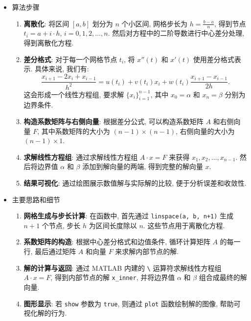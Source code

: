\documentclass[11pt]{article}
\begin{document}
\begin{itemize}
	\item 算法步骤
	
	\begin{enumerate}
		\item \textbf{离散化}: 将区间 $[a, b]$ 划分为 $n$ 个小区间, 网格步长为 $h = \frac{b - a}{n}$, 得到节点 $t_i = a + i \cdot h$, $i=0, 1, 2, \dots, n$. 然后对方程中的二阶导数进行中心差分处理, 得到离散化方程. 
		
		\item \textbf{差分格式}: 对于每一个网格节点 $t_i$, 将 $x''(t)$ 和 $x'(t)$ 使用差分格式表示. 具体来说, 我们有:
		\begin{equation*}
			\frac{x_{i+1} - 2x_i + x_{i-1}}{h^2} = u(t_i) + v(t_i) x_i + w(t_i) \frac{x_{i+1} - x_{i-1}}{2h}.
		\end{equation*}
		这会形成一个线性方程组, 要求解 $\{x_i\}_{i=1}^{n-1}$, 其中 $x_0 = \alpha$ 和 $x_n = \beta$ 分别为边界条件.
		
		\item \textbf{构造系数矩阵与右侧向量}: 根据差分公式, 可以构造系数矩阵 $A$ 和右侧向量 $F$, 其中系数矩阵的大小为 $(n-1) \times (n-1)$, 右侧向量的大小为 $(n-1) \times 1$.
		
		\item \textbf{求解线性方程组}: 通过求解线性方程组 $A \cdot x = F$ 来获得 $x_1, x_2, \dots, x_{n-1}$. 然后将边界值 $\alpha$ 和 $\beta$ 添加到解向量的两端, 得到完整的解向量 $x$.
		
		\item \textbf{结果可视化}: 通过绘图展示数值解与实际解的比较, 便于分析误差和收敛性.
	\end{enumerate}
	
	\item 主要思路和细节
	
	\begin{enumerate}
		\item \textbf{网格生成与步长计算}: 在函数中, 首先通过 \texttt{linspace(a, b, n+1)} 生成 $n+1$ 个节点, 步长 $h$ 为区间长度除以 $n$. 这些节点用于离散化方程. 
		
		\item \textbf{系数矩阵的构造}: 根据中心差分格式和边值条件, 循环计算矩阵 $A$ 的每一行, 最后通过矩阵 $A$ 和向量 $F$ 来求解内部节点的解. 
		
		\item \textbf{解的计算与返回}: 通过 MATLAB 内建的 \texttt{\textbackslash} 运算符求解线性方程组 $A \cdot x = F$, 得到内部节点的解 \texttt{x\_inner}, 并将边界值 $\alpha$ 和 $\beta$ 组合成最终的解向量. 
		
		\item \textbf{图形显示}: 若 \texttt{show} 参数为 \texttt{true}, 则通过 \texttt{plot} 函数绘制解的图像, 帮助可视化解的行为. 
	\end{enumerate}
\end{itemize}
\end{document}
